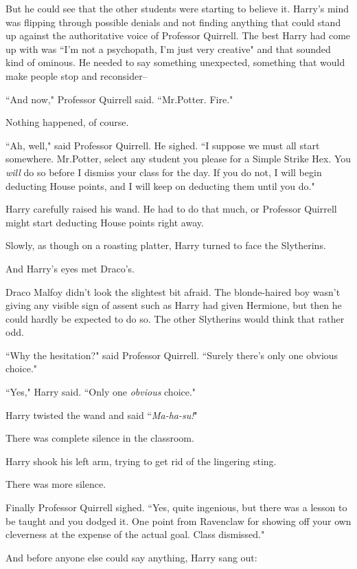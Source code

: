 But he could see that the other students were starting to believe it. Harry's mind was flipping through possible denials and not finding anything that could stand up against the authoritative voice of Professor Quirrell. The best Harry had come up with was ``I'm not a psychopath, I'm just very creative" and that sounded kind of ominous. He needed to say something unexpected, something that would make people stop and reconsider\---

``And now," Professor Quirrell said. ``Mr.\?Potter. Fire."

Nothing happened, of course.

``Ah, well," said Professor Quirrell. He sighed. ``I suppose we must all start somewhere. Mr.\?Potter, select any student you please for a Simple Strike Hex. You \emph{will} do so before I dismiss your class for the day. If you do not, I will begin deducting House points, and I will keep on deducting them until you do."

Harry carefully raised his wand. He had to do that much, or Professor Quirrell might start deducting House points right away.

Slowly, as though on a roasting platter, Harry turned to face the Slytherins.

And Harry's eyes met Draco's.

Draco Malfoy didn't look the slightest bit afraid. The blonde-haired boy wasn't giving any visible sign of assent such as Harry had given Hermione, but then he could hardly be expected to do so. The other Slytherins would think that rather odd.

``Why the hesitation?" said Professor Quirrell. ``Surely there's only one obvious choice."

``Yes," Harry said. ``Only one \emph{obvious} choice."

Harry twisted the wand and said ``\emph{Ma-ha-su!}"

There was complete silence in the classroom.

Harry shook his left arm, trying to get rid of the lingering sting.

There was more silence.

Finally Professor Quirrell sighed. ``Yes, quite ingenious, but there was a lesson to be taught and you dodged it. One point from Ravenclaw for showing off your own cleverness at the expense of the actual goal. Class dismissed."

And before anyone else could say anything, Harry sang out:


